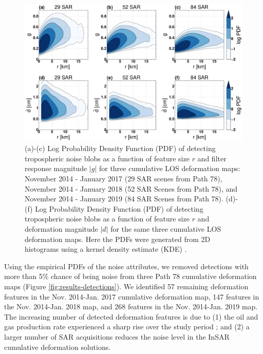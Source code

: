 \documentclass{utexasthesis}
\begin{document}
\begin{figure}[hbt!]
	\centering 
	\includegraphics[width=0.98\linewidth]{paper2/figures/figure_results_kde.pdf}
	\caption[Estimates of empirical tropospheric noise probability density]{ (a)-(c) Log Probability Density Function (PDF) of detecting tropospheric noise blobs as a function of feature size $r$ and filter response magnitude $|g|$ for three cumulative LOS deformation maps: November 2014 - January 2017 (29 SAR scenes from Path 78), November 2014 - January 2018 (52 SAR Scenes from Path 78), and November 2014 - January 2019 (84 SAR Scenes from Path 78).
	(d)-(f) Log Probability Density Function (PDF) of detecting tropospheric noise blobs as a function of feature size $r$ and deformation magnitude $|d|$ for the same three cumulative LOS deformation maps.
	Here the PDFs were generated from 2D histograms using a kernel density estimate (KDE) \cite{Scott2015MultivariateDensityEstimation}.
	}
	\label{fig:results-kde}
\end{figure}




Using the empirical PDFs of the noise attributes, we removed detections with more than 5\% chance of being noise from three Path 78 cumulative deformation maps (Figure \ref{fig:results-detections}). We identified 57 remaining deformation features in the Nov. 2014-Jan. 2017 cumulative deformation map, 147 features in the Nov. 2014-Jan. 2018 map, and 268 features in the Nov. 2014-Jan. 2019 map. The increasing number of detected deformation features is due to (1) the oil and gas production rate experienced a sharp rise over the study period \cite{Staniewicz2020InsarRevealsComplex}; and (2) a larger number of SAR acquisitions reduces the noise level in the InSAR cumulative deformation solutions.
\end{document}

